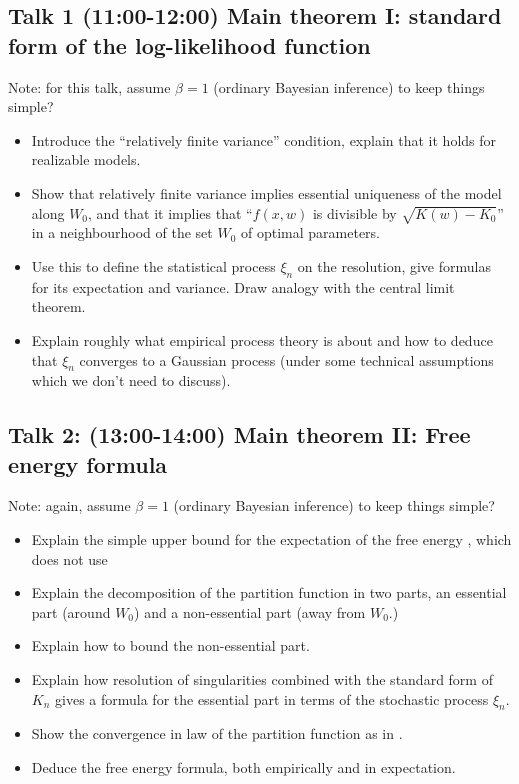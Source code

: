 \documentclass[a4paper,11pt]{amsart}
\begin{document}
\subsection*{Talk 1 (11:00-12:00) Main theorem I: standard form of the log-likelihood function}

Note: for this talk, assume $\beta=1$ (ordinary Bayesian inference) to keep things simple?

\begin{itemize}
\item Introduce the ``relatively finite variance'' condition, explain that it holds for realizable models.
\item Show that relatively finite variance implies essential uniqueness of the model along $W_{0}$, and that it implies that ``$f(x,w)$ is divisible by $\sqrt{K(w)-K_{0}}$'' in a neighbourhood of the set $W_{0}$ of optimal parameters.
\item Use this to define the statistical process $\xi_{n}$ on the resolution, give formulas for its expectation and variance. Draw analogy with the central limit theorem.
\item Explain roughly what empirical process theory is about and how to deduce that $\xi_{n}$ converges to a Gaussian process (under some technical assumptions which we don't need to discuss).
\end{itemize}

\subsection*{Talk 2: (13:00-14:00) Main theorem II: Free energy formula}

Note: again, assume $\beta=1$ (ordinary Bayesian inference) to keep things simple?


\begin{itemize}
\item Explain the simple upper bound for the expectation of the free energy \cite[Theorem 6.4]{grey-book}, which does not use   
\item Explain the decomposition of the partition function in two parts, an essential part (around $W_{0}$) and a non-essential part (away from $W_{0}$.)
\item Explain how to bound the non-essential part.
\item Explain how resolution of singularities combined with the standard form of $K_{n}$ gives a formula for the essential part in terms of the stochastic process $\xi_{n}$.  
\item Show the convergence in law of the partition function as in \cite[Theorem 6.7]{grey-book}.
\item Deduce the free energy formula, both empirically and in expectation.  
\end{itemize}
\end{document}
